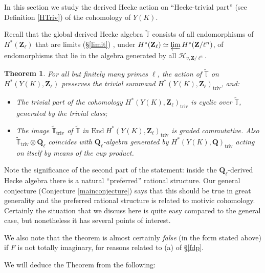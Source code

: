 \documentclass[10pt]{amsart}
\newcommand{\changecolor}{black}
\newcommand{\Z}{\mathbf{Z}}
\newcommand{\triv}{\mathrm{triv}}
\newcommand{\gHecke}{\tilde{\mathbb{T}}}
\newcommand{\End}{\mathrm{End}}
\newcommand{\Q}{\mathbf{Q}}
\newtheorem{theorem}[subsection]{Theorem}
\theoremstyle{remark}
\begin{document}
 In this section we study the
 derived Hecke action on  ``Hecke-trivial part''  (see Definition \ref{HTriv}) of the cohomology of $Y(K)$. 
  
 Recall that  the global derived Hecke algebra $\gHecke$ consists of all endomorphisms of $H^*(\Z_{\ell})$
that are limits (\S \ref{limit}) , under $H^*(\Z_{\ell}) \simeq \varprojlim H^*(\Z/\ell^n)$, of
endomorphisms that lie in the algebra generated by all $  \mathscr{H}_{v,\Z/\ell^n}$.  
 
 
 
 
 
\begin{theorem}\label{maintheoremtriv} 
For all but finitely many primes $\ell$, 
{\color{\changecolor} the action of $\gHecke$ on $H^*(Y(K), \Z_{\ell})$ preserves the trivial summand $H^*(Y(K), \Z_{\ell})_{\triv}$, and:}
\begin{itemize} 
\item[(i)] The trivial part of the cohomology
$H^*(Y(K), \Z_{\ell})_{\mathrm{triv}}$ is cyclic over $\gHecke$, generated by the trivial class;
\item[(ii)]  The image $\gHecke_{\triv}$ of $\gHecke$ in $\End \ H^*(Y(K), \Z_{\ell})_{\triv}$
is graded commutative. Also $\gHecke_{\triv} \otimes \Q_{\ell}$ 
coincides with $\Q_{\ell}$-algebra generated by $H^*(Y(K), \Q)_{\triv}$ acting
 on itself by means of the cup product. 
 \end{itemize}
\end{theorem}





 Note the significance of the second part of the statement: inside the $\Q_{\ell}$-derived Hecke algebra there is a natural ``preferred''
 rational structure. Our general conjecture (Conjecture \ref{mainconjecture}) says that this should be true in great generality and the preferred rational structure is related to motivic cohomology.   Certainly the situation that we discuss here is quite easy
 compared to the general case, but nonetheless it has several points of interest. 
 
We also note that the theorem  is almost certainly {\em false} (in the form stated above) if $F$ is not totally imaginary, for reasons related to  (a) of \S \ref{fdp}. 
 
%
%
%
%
%
%
%

We will deduce the Theorem from the following: 
 
\end{document}
